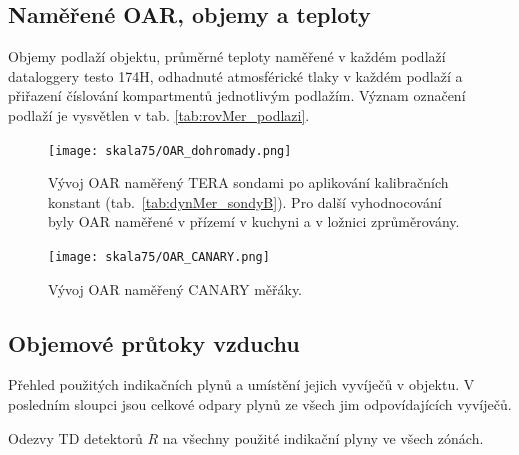 \subsection{Naměřené OAR, objemy a teploty}

\begin{table}[H]
    \centering
    \caption{Objemy podlaží objektu, průměrné teploty naměřené v každém podlaží dataloggery testo 174H, odhadnuté atmosférické tlaky v každém podlaží a přiřazení číslování kompartmentů jednotlivým podlažím. Význam označení podlaží je vysvětlen v tab. \ref{tab:rovMer_podlazi}.}
    \label{tab:skala75_objemy}
    
\end{table}
\begin{figure}[H]
    \centering
    \texttt{[image: skala75/OAR\_dohromady.png]}
    \caption{Vývoj OAR naměřený TERA sondami po aplikování kalibračních konstant (tab.~\ref{tab:dynMer_sondyB}). Pro další vyhodnocování byly OAR naměřené v přízemí v kuchyni a v ložnici zprůměrovány.}
    \label{fig:skala75_OAR_dohromady}
\end{figure}
\begin{figure}[H]
    \centering
    \texttt{[image: skala75/OAR\_CANARY.png]}
    \caption{Vývoj OAR naměřený CANARY měřáky.}
    \label{fig:skala75_OAR_CANARY}
\end{figure}
\subsection{Objemové průtoky vzduchu}

\begin{table}[H]
    \centering
    \caption{Přehled použitých indikačních plynů a umístění jejich vyvíječů v objektu. V posledním sloupci jsou celkové odpary plynů ze všech jim odpovídajících vyvíječů.}
    \label{tab:skala75_indikacniPlyny}
    
\end{table}
\begin{table}[H]
    \centering
    \caption{Odezvy TD detektorů $R$ na všechny použité indikační plyny ve všech zónách.}
    \label{tab:skala75_odezvyTD}
    
\end{table}

